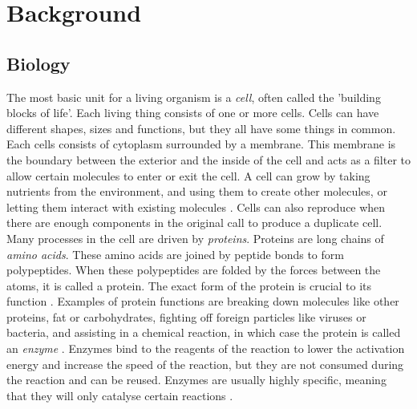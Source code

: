 \documentclass[../main/thesis.tex]{subfiles}
\begin{document}
\chapter{Background}
\ifdefined\main
\newcommand{\codePath}{2_background/code/}
\newcommand{\figPath}{2_background/figures/}
\else

\fi


\section{Biology}
The most basic unit for a living organism is a \textit{cell}, often called the 'building blocks of life'.
Each living thing consists of one or more cells.
Cells can have different shapes, sizes and functions, but they all have some things in common.
Each cells consists of cytoplasm surrounded by a membrane.
This membrane is the boundary between the exterior and the inside of the cell and acts as a filter to allow certain molecules to enter or exit the cell.
A cell can grow by taking nutrients from the environment, and using them to create other molecules, or letting them interact with existing molecules \cite{bioinformatics}.
Cells can also reproduce when there are enough components in the original call to produce a duplicate cell.
Many processes in the cell are driven by \textit{proteins}.
Proteins are long chains of \textit{amino acids}.
These amino acids are joined by peptide bonds to form polypeptides.
When these polypeptides are folded by the forces between the atoms, it is called a protein.
The exact form of the protein is crucial to its function \cite{protein_misfolding}.
Examples of protein functions are breaking down molecules like other proteins, fat or carbohydrates, fighting off foreign particles like viruses or bacteria, and assisting in a chemical reaction, in which case the protein is called an \textit{enzyme} \cite{protein_function}.
Enzymes bind to the reagents of the reaction to lower the activation energy and increase the speed of the reaction, but they are not consumed during the reaction and can be reused.
Enzymes are usually highly specific, meaning that they will only catalyse certain reactions \cite{enzyme_specificity1}\cite{enzyme_specificity2}.
\end{document}
